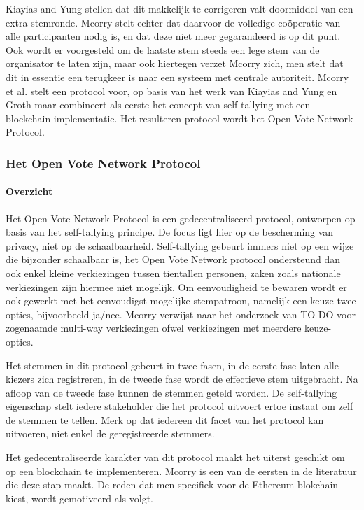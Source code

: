 		Kiayias and Yung  stellen dat dit makkelijk te corrigeren valt doormiddel van een extra stemronde. Mcorry stelt echter dat daarvoor de volledige coöperatie van alle participanten nodig is, en dat deze niet meer gegarandeerd is op dit punt. Ook wordt er voorgesteld om de laatste stem steeds een lege stem van de organisator te laten zijn, maar ook hiertegen verzet Mcorry zich, men stelt dat dit in essentie een terugkeer is naar een systeem met centrale autoriteit.  Mcorry et al. stelt een protocol voor, op basis van het werk van Kiayias and Yung en Groth maar combineert als eerste het concept van self-tallying met een blockchain implementatie. Het resulteren protocol wordt het Open Vote Network Protocol.
	
		\subsubsection{Het Open Vote Network Protocol}
			\paragraph*{Overzicht }
			Het Open Vote Network Protocol is een gedecentraliseerd protocol, ontworpen op basis van het self-tallying principe. De focus ligt hier op de bescherming van privacy, niet op de schaalbaarheid. Self-tallying gebeurt immers niet op een wijze die bijzonder schaalbaar is, het  Open Vote Network protocol ondersteund dan ook enkel kleine verkiezingen tussen tientallen personen, zaken zoals nationale verkiezingen zijn hiermee niet mogelijk. Om eenvoudigheid te bewaren wordt er ook gewerkt met het eenvoudigst mogelijke stempatroon, namelijk een keuze twee opties, bijvoorbeeld ja/nee.  Mcorry verwijst naar het onderzoek van TO DO voor zogenaamde multi-way verkiezingen ofwel verkiezingen met meerdere keuze-opties.
			
			Het stemmen in dit protocol gebeurt in twee fasen, in de eerste fase laten alle kiezers zich registreren, in de tweede fase wordt de effectieve stem uitgebracht. Na afloop van de tweede fase kunnen de stemmen geteld worden.  De self-tallying eigenschap stelt iedere stakeholder die het protocol uitvoert ertoe instaat om zelf de stemmen te tellen. Merk op dat iedereen dit facet van het protocol kan uitvoeren, niet enkel de geregistreerde stemmers.
			 
			Het gedecentraliseerde karakter van dit protocol maakt het uiterst geschikt om op een blockchain te implementeren. Mcorry is een van de eersten in de literatuur die deze stap maakt. De reden dat men specifiek voor de Ethereum blokchain kiest, wordt gemotiveerd als volgt.
			
